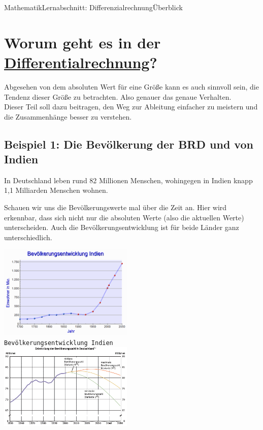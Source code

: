 \documentclass[11pt,twocolumn,oneside,openany,headings=optiontotoc,11pt,numbers=noenddot,final]{article}
\begin{document}
	\begin{worksheet}{Mathematik}{Lernabschnitt: Differenzialrechnung}{Überblick}
		\setcounter{section}{6}
		\section{Worum geht es in der \underline{Differentialrechnung}?}
		Abgesehen von dem absoluten Wert für eine Größe kann es auch sinnvoll sein, die Tendenz dieser Größe zu betrachten. Also genauer das genaue Verhalten.\\
		Dieser Teil soll dazu beitragen, den Weg zur \grqq{}Ableitung\grqq{} einfacher zu meistern und die Zusammenhänge besser zu verstehen.
		\subsection*{Beispiel  1: Die Bevölkerung der BRD und von Indien}
		In Deutschland leben rund 82 Millionen Menschen, wohingegen in Indien knapp 1,1 Milliarden Menschen wohnen.\\
		\par\noindent
		Schauen wir uns die Bevölkerungswerte mal über die Zeit an. Hier wird erkennbar, dass sich nicht nur die absoluten Werte (also die aktuellen Werte) unterscheiden. Auch die Bevölkerungsentwicklung ist für beide Länder ganz unterschiedlich.\\
		\par\noindent
		\includegraphics[width=0.48\textwidth]{../99_Bilder/04_Skr_BevInd.png}\\
		\footnotesize{\texttt{Bevölkerungsentwicklung Indien}}\\
		\includegraphics[width=0.48\textwidth]{../99_Bilder/04_Skr_BevDeu.png}\\

\end{worksheet}
\end{document}
